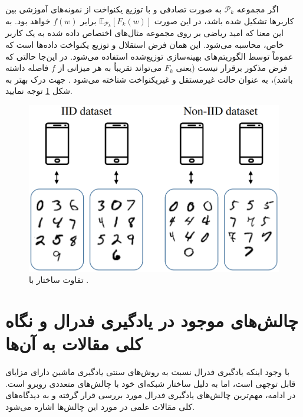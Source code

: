 اگر مجموعه 
$\mathcal{P}_k$ 
به صورت تصادفی و با توزیع یکنواخت%
از نمونه‌های آموزشی بین کاربر‌ها تشکیل شده باشد، در این صورت 
$\mathbb{E}_{\mathcal{P}_k}\left[F_k(w)\right]$ 
برابر
$f(w)$ 
خواهد بود. به این معنا که امید ریاضی بر روی مجموعه مثال‌های اختصاص داده شده به یک کاربر خاص، محاسبه می‌شود.
این همان فرض
استقلال و توزیع یکنواخت داده‌ها%
است که عموماً توسط الگوریتم‌های بهینه‌سازی توزیع‌شده استفاده می‌شود. در این‌جا حالتی که فرض مذکور برقرار نیست (یعنی
$F_k$
می‌تواند تقریباً به هر میزانی از
$f$
فاصله داشته باشد)، به عنوان حالت
غیرمستقل و غیریکنواخت
شناخته می‌شود
\cite{mcmahan2017communication}.
جهت درک بهتر به شکل
\ref{iid_vs_noniid}
توجه نمایید.


\begin{figure}[t]
	\centering
	\includegraphics[scale=0.4]{images/chap2/iid_vs_noniid.png}%
	\caption{%
		تفاوت ساختار
		با
		\cite{hellström2022wirelessmachinelearning}.
	}
	\label{iid_vs_noniid}
	\centering
\end{figure}



\section{چالش‌های موجود در یادگیری فدرال و نگاه کلی مقالات به آن‌ها}
با وجود اینکه یادگیری فدرال نسبت به روش‌های سنتی یادگیری ماشین دارای مزایای قابل توجهی است، اما به دلیل ساختار شبکه‌ای خود با چالش‌های متعددی روبرو است. در ادامه، مهم‌ترین چالش‌های یادگیری فدرال مورد بررسی قرار گرفته و به دیدگاه‌های کلی مقالات علمی در مورد این چالش‌ها اشاره می‌شود.


